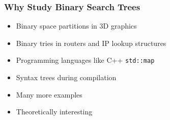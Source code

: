 \documentclass[]{beamer}
\theoremstyle{plain}
\begin{document}
\iffalse

\begin{frame} \frametitle{Why Study Binary Search Trees}


\begin{itemize}
\item AVL trees self-balancing BST in 1963, maintains $O(\lg(n))$ height \cite{adelsonvelskii1963algorithm}

\item B-trees/Red-black trees by R. Bayer in 1972 (with later extensions by others) \cite{bayer1972symmetric}

\item  Allen and Munro examined a MTR heuristic \cite{allen1978self}

\item Splay trees of Sleator and Tarjan in 1985, dynamic optimality conjecture \cite{sleator1985self}

\item Tango trees in 2007 by Demaine et al., $O(\lg \lg n)$-competitive \cite{demaine2007dynamic}

\end{itemize}

\end{frame}
\fi

\begin{frame} \frametitle{Why Study Binary Search Trees}

\begin{itemize}

\item Binary space partitions in 3D graphics \cite{schumacker1969study, paterson1992optimal}

\item Binary tries in routers and IP lookup structures \cite{song2010building}

\item Programming languages like C++ \texttt{std::map} \cite{CppMap} 

\item Syntax trees during compilation \cite{louden1997compiler}

\item Many more examples

\item Theoretically interesting

\end{itemize}

\end{frame}
\end{document}
